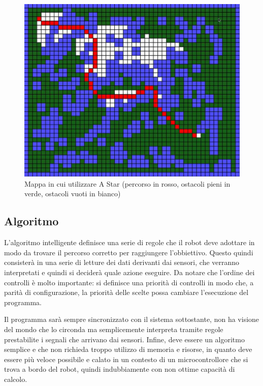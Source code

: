 \documentclass[a4paper,titlepage]{book}
\begin{document}
\begin{figure}[htbp]
\centering
\includegraphics[scale=0.3]{a_star.jpg}
\caption{Mappa in cui utilizzare A Star (percorso in rosso, ostacoli pieni in verde, ostacoli vuoti in bianco)}\label{fig:8}
\end{figure}

\newpage

\subsection{Algoritmo}

L'algoritmo intelligente definisce una serie di regole che il robot deve adottare in modo da trovare il percorso corretto per raggiungere l'obbiettivo. Questo quindi consisterà in una serie di letture dei dati derivanti dai sensori, che verranno interpretati e quindi si deciderà quale azione eseguire. Da notare che l'ordine dei controlli è molto importante: si definisce una priorità di controlli in modo che, a parità di configurazione, la priorità delle scelte possa cambiare l'esecuzione del programma.


Il programma sarà sempre sincronizzato con il sistema sottostante, non ha visione del mondo che lo circonda ma semplicemente interpreta tramite regole prestabilite i segnali che arrivano dai sensori. Infine, deve essere un algoritmo semplice e che non richieda troppo utilizzo di memoria e risorse, in quanto deve essere più veloce possibile e calato in un contesto di un microcontrollore che si trova a bordo del robot, quindi indubbiamente con non ottime capacità di calcolo.
\end{document}
